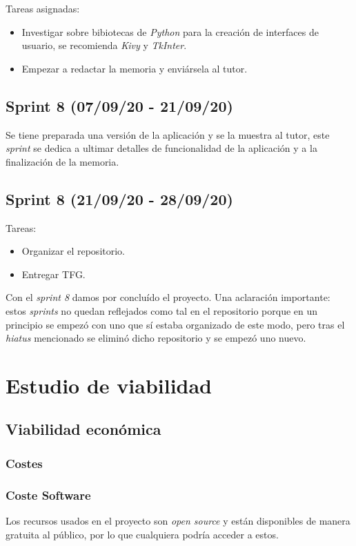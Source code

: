 Tareas asignadas:
\begin{itemize}
    \item Investigar sobre bibiotecas de \emph{Python} para la creación de interfaces de usuario, se recomienda \emph{Kivy} y \emph{TkInter}.
    \item Empezar a redactar la memoria y enviársela al tutor.
\end{itemize}

\subsection{Sprint 8 (07/09/20 - 21/09/20)}
Se tiene preparada una versión de la aplicación y se la muestra al tutor, este \emph{sprint} se dedica a ultimar detalles de funcionalidad de la aplicación y a la finalización de la memoria.

\subsection{Sprint 8 (21/09/20 - 28/09/20)}
Tareas:
\begin{itemize}
    \item Organizar el repositorio.
    \item Entregar TFG.
\end{itemize}

Con el \emph{sprint 8} damos por concluído el proyecto. Una aclaración importante: estos \emph{sprints} no quedan reflejados como tal en el repositorio porque en un principio se empezó con uno que sí estaba organizado de este modo, pero tras el \emph{hiatus} mencionado se eliminó dicho repositorio y se empezó uno nuevo.
\section{Estudio de viabilidad}

\subsection{Viabilidad económica}

\subsubsection{Costes}
\subsubsection{Coste Software}
Los recursos usados en el proyecto son \emph{open source} y están disponibles de manera gratuita al público, por lo que cualquiera podría acceder a estos.

